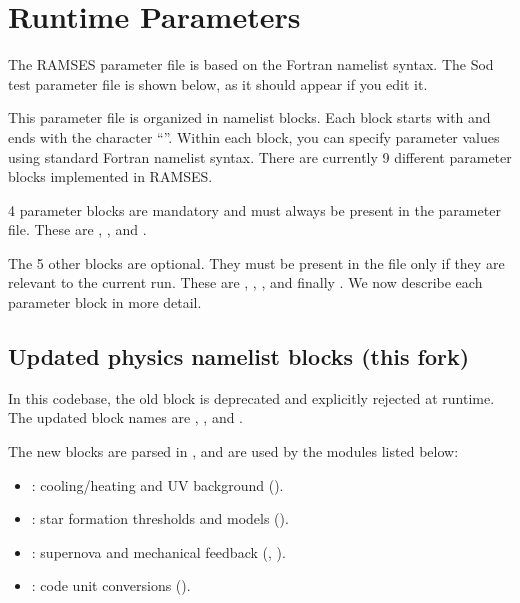 \clearpage
\section{Runtime Parameters}

The RAMSES parameter file is based on the Fortran namelist syntax. The
Sod test parameter file is shown below, as it should appear if you edit
it.

\logfile{\fullnmlfilename}

This parameter file is organized in namelist blocks. Each block starts
with  and ends with the character ``\cmd{/}''. Within
each block, you can specify parameter values using standard Fortran
namelist syntax. There are currently 9 different parameter blocks
implemented in RAMSES.

\begin{warning}
4 parameter blocks are mandatory and must always be present in the
parameter file. These are ,
,  and
.
\end{warning}

The 5 other blocks are optional. They must be present in the file only
if they are relevant to the current run. These are
, ,
,  and finally
. We now describe each parameter block in
more detail.

\clearpage
\subsection{Updated physics namelist blocks (this fork)}
\label{sec:runtimeparams-updated-physics}

\begin{warning}
In this codebase, the old  block is deprecated
and explicitly rejected at runtime. The updated block names are
, ,
 and .
\end{warning}

The new blocks are parsed in , and are
used by the modules listed below:

\begin{itemize}
   \item {}: cooling/heating and UV background
   ().
   \item {}: star formation thresholds and models
   ().
   \item {}: supernova and mechanical feedback
   (, ).
   \item {}: code unit conversions
   ().
\end{itemize}

